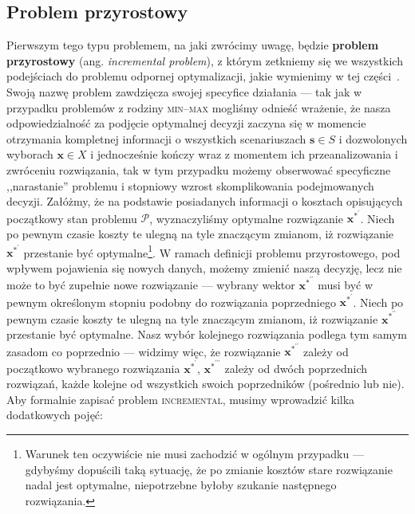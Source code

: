 \subsection{Problem przyrostowy}

Pierwszym tego typu problemem, na jaki zwrócimy uwagę, będzie \textbf{problem przyrostowy} (ang. \textit{incremental problem}), z którym zetkniemy się we wszystkich podejściach do problemu odpornej optymalizacji, jakie wymienimy w tej części~\cite[$1$-$2$]{DBLP:journals/corr/NasrabadiO13}\cite[$586$]{incNetOpt}. Swoją nazwę problem zawdzięcza swojej specyfice działania --- tak jak w przypadku problemów z rodziny \textsc{min--max} mogliśmy odnieść wrażenie, że nasza odpowiedzialność za podjęcie optymalnej decyzji zaczyna się w momencie otrzymania kompletnej informacji o wszystkich scenariuszach $\textbf{s} \in S$ i dozwolonych wyborach $\textbf{x} \in X$ i jednocześnie kończy wraz z momentem ich przeanalizowania i zwróceniu rozwiązania, tak w tym przypadku możemy obserwować specyficzne ,,narastanie'' problemu i stopniowy wzrost skomplikowania podejmowanych decyzji. Załóżmy, że na podstawie posiadanych informacji o kosztach opisujących początkowy stan problemu $\mathcal{P}$, wyznaczyliśmy optymalne rozwiązanie $\textbf{x}^{\ast^{\prime}}$. Niech po pewnym czasie koszty te ulegną na tyle znaczącym zmianom, iż rozwiązanie $\textbf{x}^{\ast^{\prime}}$ przestanie być optymalne\footnote{Warunek ten oczywiście nie musi zachodzić w ogólnym przypadku --- gdybyśmy dopuścili taką sytuację, że po zmianie kosztów stare rozwiązanie nadal jest optymalne, niepotrzebne byłoby szukanie następnego rozwiązania.}. W ramach definicji problemu przyrostowego, pod wpływem pojawienia się nowych danych, możemy zmienić naszą decyzję, lecz nie może to być zupełnie nowe rozwiązanie --- wybrany wektor $\textbf{x}^{\ast^{\prime\prime}}$ musi być w pewnym określonym stopniu podobny do rozwiązania poprzedniego $\textbf{x}^{\ast^{\prime}}$.  Niech po pewnym czasie koszty te ulegną na tyle znaczącym zmianom, iż rozwiązanie $\textbf{x}^{\ast^{\prime\prime}}$ przestanie być optymalne. Nasz wybór kolejnego rozwiązania podlega tym samym zasadom co poprzednio --- widzimy więc, że rozwiązanie $\textbf{x}^{\ast^{\prime\prime}}$ zależy od początkowo wybranego rozwiązania $\textbf{x}^{\ast^{\prime}}$, $\textbf{x}^{\ast^{\prime\prime\prime}}$ zależy od dwóch poprzednich rozwiązań, każde kolejne od wszystkich swoich poprzedników (pośrednio lub nie). Aby formalnie zapisać problem \textsc{incremental}, musimy wprowadzić kilka dodatkowych pojęć:

